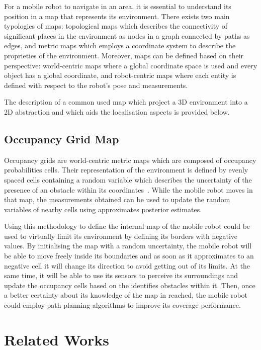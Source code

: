 \noindent For a mobile robot to navigate in an area, it is essential to understand its position in a map that represents its environment.
There exists two main typologies of maps: topological maps which describes the connectivity
of significant places in the environment as nodes in a graph connected by paths as edges, and metric maps which employs a coordinate system to describe the proprieties of the environment.
Moreover, maps can be defined based on their perspective: world-centric maps where a global coordinate space is used and every object has a global coordinate, and robot-centric maps where each entity is defined with respect to the robot's pose and measurements.

The description of a common used map which project a \gls{3D} environment into a \gls{2D} abstraction and which aids the localisation aspects is provided below.

\subsection{Occupancy Grid Map}
\noindent Occupancy grids are world-centric metric maps which are composed of occupancy probabilities cells.
Their representation of the environment is defined by evenly spaced cells containing a random variable which describes the uncertainty of the presence of an obstacle within its coordinates~\cite{thrun_probabilistic_2005}.
While the mobile robot moves in that map, the measurements obtained can be used to update the random variables of nearby cells using approximates posterior estimates.

Using this methodology to define the internal map of the mobile robot could be used to virtually limit its environment by defining its borders with negative values.
By initialising the map with a random uncertainty, the mobile robot will be able to move freely inside its boundaries and as soon as it approximates to an negative cell it will change its direction to avoid getting out of its limits.
At the same time, it will be able to use its sensors to perceive its surroundings and update the occupancy cells based on the identifies obstacles within it.
Then, once a better certainty about its knowledge of the map in reached, the mobile robot could employ path planning algorithms to improve its coverage performance.
    



\section{Related Works}

